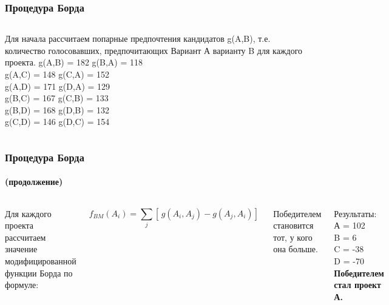 \documentclass[10pt]{beamer}
\begin{document}
\begin{frame}
  \frametitle{Процедура Борда}
\begin{columns}
    Для начала рассчитаем попарные предпочтения кандидатов g(A,B), т.е. количество голосовавших, предпочитающих Вариант А варианту B для каждого проекта.
  g(A,B) = 182 \quad  g(B,A) = 118\\
  g(A,C) = 148 \quad  g(C,A) = 152\\
  g(A,D) = 171 \quad  g(D,A) = 129\\
  g(B,C) = 167 \quad  g(C,B) = 133\\
  g(B,D) = 168 \quad  g(D,B) = 132\\
  g(C,D) = 146 \quad  g(D,C) = 154\\
\end{columns}
\end{frame}

\begin{frame}
  \frametitle{Процедура Борда}
  \framesubtitle{(продолжение)}
  \begin{columns}
    Для каждого проекта рассчитаем значение модифицированной функции Борда по формуле:

    \begin{equation*}
      f_{BM}(A_{i})=\sum\limits_{j}[\,g(A_{i},A_{j})-g(A_{j},A_{i})]\,
    \end{equation*}

    Победителем становится тот, у кого она больше.

    Результаты:\\
    А = 102\\
    B = 6\\
    C = -38\\
    D = -70\\
    \textbf{Победителем стал проект А.}

  \end{columns}
\end{frame}
\end{document}
